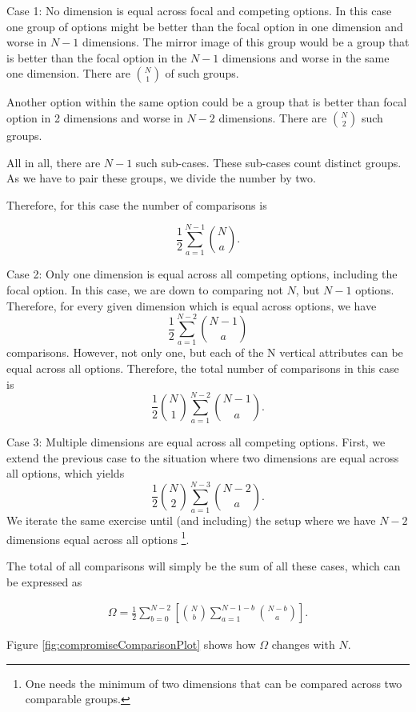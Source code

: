 \documentclass[a4paper,12pt]{article}
\begin{document}
Case 1: No dimension is equal across focal and competing options. In this case one group of options might be better than the focal option in one dimension and worse in $N-1$ dimensions. The mirror image of this group would be a group that is better than the focal option in the $N-1$ dimensions and worse in the same one dimension. There are $\binom{N}{1}$ of such groups.

Another option within the same option could be a group that is better than focal option in 2 dimensions and worse in $N-2$ dimensions. There are $\binom{N}{2}$ such groups. 

All in all, there are $N-1$ such sub-cases. These sub-cases count distinct groups. As we have to pair these groups, we divide the number by two.

Therefore, for this case the number of comparisons is 

$$\frac{1}{2}\sum_{a=1}^{N-1}\binom{N}{a}.$$

Case 2: Only one dimension is equal across all competing options, including the focal option. In this case, we are down to comparing not $N$, but $N-1$ options. Therefore, for every given dimension which is equal across options, we have $$\frac{1}{2}\sum_{a=1}^{N-2}\binom{N-1}{a}$$ comparisons. However, not only one, but each of the N vertical attributes can be equal across all options. Therefore, the total number of comparisons in this case is $$\frac{1}{2}\binom{N}{1}\sum_{a=1}^{N-2}{\binom{N-1}{a}.}$$

Case 3: Multiple dimensions are equal across all competing options. First, we extend the previous case to the situation where two dimensions are equal across all options, which yields $$\frac{1}{2}\binom{N}{2}\sum_{a=1}^{N-3}{\binom{N-2}{a}}.$$ We iterate the same exercise until (and including) the setup where we have $N-2$ dimensions equal across all options \footnote{One needs the minimum of two dimensions that can be compared across two comparable groups.}. 

The total of all comparisons will simply be the sum of all these cases, which can be expressed as

\begin{align}\label{eq:compromiseEffectDetailedCalculation}
    \Omega=\frac{1}{2}\sum_{b=0}^{N-2}\left[\binom{N}{b}\sum_{a=1}^{N-1-b}\binom{N-b}{a}\right].    
\end{align}


Figure \ref{fig:compromiseComparisonPlot} shows how $\Omega$ changes with $N$.
\end{document}
